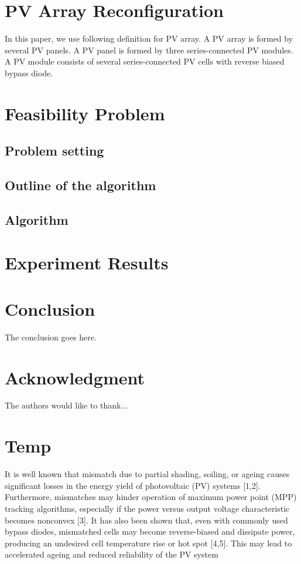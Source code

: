 \documentclass[journal]{IEEEtran}
\begin{document}
\section{PV Array Reconfiguration}
In this paper, we use following definition for PV array.
A PV array is formed by several PV panels.
A PV panel is formed by three series-connected PV modules.
A PV module consists of several series-connected PV cells with reverse biased bypass diode.

\section{Feasibility Problem}
\subsection{Problem setting}
\subsection{Outline of the algorithm}
\subsection{Algorithm}
\section{Experiment Results}
\section{Conclusion}
The conclusion goes here.



\appendices
\section*{Acknowledgment}


The authors would like to thank...


\section*{Temp}
It is well known that mismatch due to partial shading, soiling, or ageing causes significant losses
in the energy yield of photovoltaic (PV) systems [1,2]. Furthermore, mismatches may hinder operation
of maximum power point (MPP) tracking algorithms, especially if the power versus output voltage
characteristic becomes nonconvex [3]. It has also been shown that, even with commonly used bypass
diodes, mismatched cells may become reverse-biased and dissipate power, producing an undesired
cell temperature rise or hot spot [4,5]. This may lead to accelerated ageing and reduced reliability of
the PV system




\end{document}
